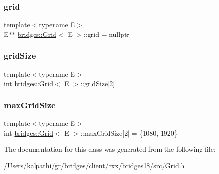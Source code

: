 \subsubsection{\texorpdfstring{grid}{grid}}
{\footnotesize\ttfamily template$<$typename E$>$ \\
E$\ast$$\ast$ \mbox{\hyperlink{classbridges_1_1_grid}{bridges\+::\+Grid}}$<$ E $>$\+::grid = nullptr\hspace{0.3cm}{\ttfamily [protected]}}

\mbox{\label{classbridges_1_1_grid_af7c3a077b54e3346621e54276c1fa13e}} 
\subsubsection{\texorpdfstring{grid\+Size}{gridSize}}
{\footnotesize\ttfamily template$<$typename E$>$ \\
int \mbox{\hyperlink{classbridges_1_1_grid}{bridges\+::\+Grid}}$<$ E $>$\+::grid\+Size\mbox{[}2\mbox{]}\hspace{0.3cm}{\ttfamily [protected]}}

\mbox{\label{classbridges_1_1_grid_a800909a94e0affac82da79cf3e6d03e5}} 
\subsubsection{\texorpdfstring{max\+Grid\+Size}{maxGridSize}}
{\footnotesize\ttfamily template$<$typename E$>$ \\
int \mbox{\hyperlink{classbridges_1_1_grid}{bridges\+::\+Grid}}$<$ E $>$\+::max\+Grid\+Size\mbox{[}2\mbox{]} = \{1080, 1920\}\hspace{0.3cm}{\ttfamily [protected]}}



The documentation for this class was generated from the following file\+:\begin{DoxyCompactItemize}
\item 
/\+Users/kalpathi/gr/bridges/client/cxx/bridges18/src/\mbox{\hyperlink{_grid_8h}{Grid.\+h}}\end{DoxyCompactItemize}
